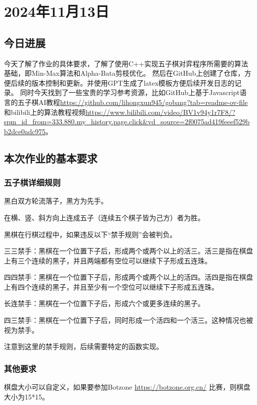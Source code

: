\section{2024年11月13日} %

\subsection{今日进展} %
今天了解了作业的具体要求，了解了使用C++实现五子棋对弈程序所需要的算法基础，即Min-Max算法和Alpha-Bata剪枝优化。
然后在GitHub上创建了仓库，方便后续的版本控制和更新。并使用GPT生成了latex模板方便后续开发日志的记录。
同时今天找到了一些宝贵的学习参考资源，比如GitHub上基于Javascript语言的五子棋AI教程\url{https://github.com/lihongxun945/gobang?tab=readme-ov-file}
和bilibili上的算法教程视频\url{https://www.bilibili.com/video/BV1v94y1r7F8/?spm_id_from=333.880.my_history.page.click&vd_source=2f0075ad419feeef529bb2dce0adc975}。


\subsection{本次作业的基本要求} 

\subsubsection{五子棋详细规则}

黑白双方轮流落子，黑方为先手。

在横、竖、斜方向上连成五子（连续五个棋子皆为己方）者为胜。

黑棋在行棋过程中，如果违反以下“禁手规则”会被判负。

三三禁手：黑棋在一个位置下子后，形成两个或两个以上的活三。活三是指在棋盘上有三个连续的黑子，并且两端都有空位可以继续下子形成五连珠。

四四禁手：黑棋在一个位置下子后，形成两个或两个以上的活四。活四是指在棋盘上有四个连续的黑子，并且至少有一个空位可以继续下子形成五连珠。

长连禁手：黑棋在一个位置下子后，形成六个或更多连续的黑子。

四三禁手：黑棋在一个位置下子后，同时形成一个活四和一个活三。这种情况也被视为禁手。

注意到这里的禁手规则，后续需要特定的函数实现。

\subsubsection{其他要求}
棋盘大小可以自定义，如果要参加Botzone \url{https://botzone.org.cn/} 比赛，则棋盘大小为15*15。

